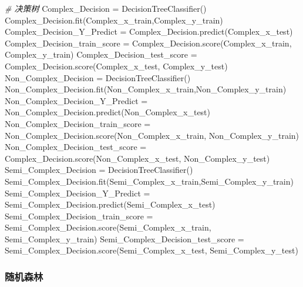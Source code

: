\documentclass[
]{article}
\newenvironment{Shaded}{}{}
\newcommand{\CommentTok}[1]{\textcolor[rgb]{0.38,0.63,0.69}{\textit{#1}}}
\newcommand{\NormalTok}[1]{#1}
\newcommand{\OperatorTok}[1]{\textcolor[rgb]{0.40,0.40,0.40}{#1}}
\begin{document}
\begin{Shaded}
\begin{Highlighting}[]
\CommentTok{\# 决策树   }
\NormalTok{Complex\_Decision }\OperatorTok{=}\NormalTok{ DecisionTreeClassifier()}
\NormalTok{Complex\_Decision.fit(Complex\_x\_train,Complex\_y\_train)}
\NormalTok{Complex\_Decision\_Y\_Predict }\OperatorTok{=}\NormalTok{ Complex\_Decision.predict(Complex\_x\_test)}
\NormalTok{Complex\_Decision\_train\_score }\OperatorTok{=}\NormalTok{ Complex\_Decision.score(Complex\_x\_train, Complex\_y\_train)}
\NormalTok{Complex\_Decision\_test\_score }\OperatorTok{=}\NormalTok{ Complex\_Decision.score(Complex\_x\_test, Complex\_y\_test)}
\NormalTok{Non\_Complex\_Decision }\OperatorTok{=}\NormalTok{ DecisionTreeClassifier()}
\NormalTok{Non\_Complex\_Decision.fit(Non\_Complex\_x\_train,Non\_Complex\_y\_train)}
\NormalTok{Non\_Complex\_Decision\_Y\_Predict }\OperatorTok{=}\NormalTok{ Non\_Complex\_Decision.predict(Non\_Complex\_x\_test)}
\NormalTok{Non\_Complex\_Decision\_train\_score }\OperatorTok{=}\NormalTok{ Non\_Complex\_Decision.score(Non\_Complex\_x\_train, Non\_Complex\_y\_train)}
\NormalTok{Non\_Complex\_Decision\_test\_score }\OperatorTok{=}\NormalTok{ Complex\_Decision.score(Non\_Complex\_x\_test, Non\_Complex\_y\_test)}
\NormalTok{Semi\_Complex\_Decision }\OperatorTok{=}\NormalTok{ DecisionTreeClassifier()}
\NormalTok{Semi\_Complex\_Decision.fit(Semi\_Complex\_x\_train,Semi\_Complex\_y\_train)}
\NormalTok{Semi\_Complex\_Decision\_Y\_Predict }\OperatorTok{=}\NormalTok{ Semi\_Complex\_Decision.predict(Semi\_Complex\_x\_test)}
\NormalTok{Semi\_Complex\_Decision\_train\_score }\OperatorTok{=}\NormalTok{ Semi\_Complex\_Decision.score(Semi\_Complex\_x\_train, Semi\_Complex\_y\_train)}
\NormalTok{Semi\_Complex\_Decision\_test\_score }\OperatorTok{=}\NormalTok{ Semi\_Complex\_Decision.score(Semi\_Complex\_x\_test, Semi\_Complex\_y\_test)}
\end{Highlighting}
\end{Shaded}

\hypertarget{header-n292}{%
\subsubsection{随机森林}\label{header-n292}}
\end{document}
